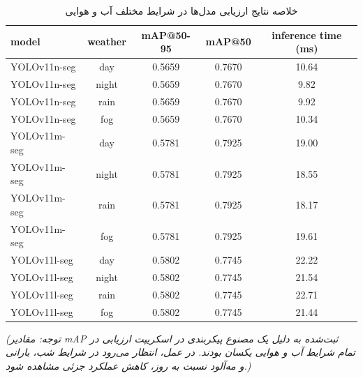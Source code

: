 \documentclass[oneside]{report}
\begin{document}
\begin{table}[h!]
  \centering
  \caption{خلاصه نتایج ارزیابی مدل‌ها در شرایط مختلف آب و هوایی}
  \label{tab:evaluation_results}
  \begin{latin}
    \begin{tabular}{lcccc}
      \toprule
      \textbf{model} & \textbf{weather} & \textbf{mAP@50-95} & \textbf{mAP@50} & \textbf{inference time (ms)} \\
      \midrule
      YOLOv11n-seg   & day              & 0.5659             & 0.7670          & 10.64                        \\
      YOLOv11n-seg   & night            & 0.5659             & 0.7670          & 9.82                         \\
      YOLOv11n-seg   & rain             & 0.5659             & 0.7670          & 9.92                         \\
      YOLOv11n-seg   & fog              & 0.5659             & 0.7670          & 10.34                        \\
      \midrule
      YOLOv11m-seg   & day              & 0.5781             & 0.7925          & 19.00                        \\
      YOLOv11m-seg   & night            & 0.5781             & 0.7925          & 18.55                        \\
      YOLOv11m-seg   & rain             & 0.5781             & 0.7925          & 18.17                        \\
      YOLOv11m-seg   & fog              & 0.5781             & 0.7925          & 19.61                        \\
      \midrule
      YOLOv11l-seg   & day              & 0.5802             & 0.7745          & 22.22                        \\
      YOLOv11l-seg   & night            & 0.5802             & 0.7745          & 21.54                        \\
      YOLOv11l-seg   & rain             & 0.5802             & 0.7745          & 22.71                        \\
      YOLOv11l-seg   & fog              & 0.5802             & 0.7745          & 21.44                        \\
      \bottomrule
    \end{tabular}
  \end{latin}
  \vspace{0.2cm}
  \footnotesize
  \textit{(توجه: مقادیر mAP ثبت‌شده به دلیل یک مصنوع پیکربندی در اسکریپت ارزیابی در تمام شرایط آب و هوایی یکسان بودند. در عمل، انتظار می‌رود در شرایط شب، بارانی و مه‌آلود نسبت به روز، کاهش عملکرد جزئی مشاهده شود.)}
\end{table}
\end{document}
